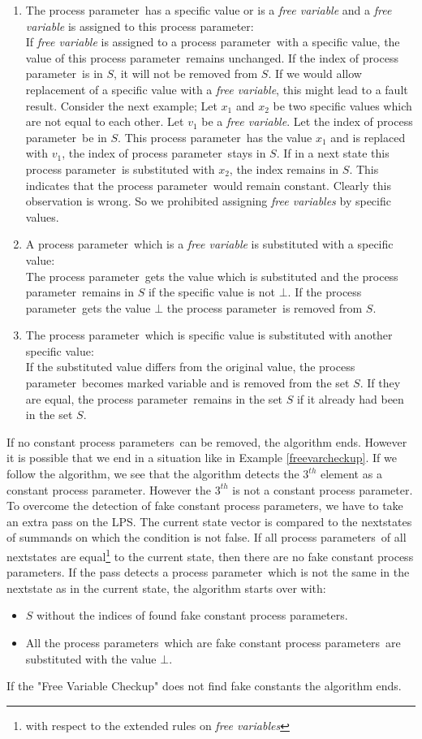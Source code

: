 \index{}\documentclass[a4paper,10pt]{article}
\theoremstyle{plain}
\theoremstyle{definition}
\newcommand{\pp}{process parameter}
\newcommand{\pps}{process parameters}
\newcommand{\ti}{\textit}
\begin{document}
\begin{enumerate}
\item The \pp\ has a specific value or is a \ti{free variable} and a \ti{free variable} is assigned to this \pp :\\
If \ti{free variable} is assigned to a \pp\ with a specific value, the value of this \pp\ remains unchanged. If the index of \pp\ is in $S$, it will not be removed from $S$. If we would allow replacement of a specific value with a \ti{free variable}, this might lead to a fault result. Consider the next example; Let $x_1$ and $x_2$ be two specific values which are not equal to each other. Let $v_1$ be a \ti{free variable}. Let the index of \pp\ be in $S$. This \pp\ has the value $x_1$ and is replaced with $v_1$, the index of \pp\ stays in $S$. If in a next state this \pp\ is substituted with $x_2$, the index remains in $S$. This indicates that the \pp\ would remain constant. Clearly this observation is wrong. So we prohibited assigning \ti{free variables} by specific values.

\item A \pp\ which is a \ti{free variable} is substituted with a specific value:\\
The \pp\ gets the value which is substituted and the \pp\ remains in $S$ if the specific value is not $\bot$. If the \pp\ gets the value $\bot$ the \pp\ is removed from $S$.

\item The \pp\ which is specific value is substituted with another specific value:\\
If the substituted value differs from the original value, the \pp\ becomes marked variable and is removed from the set $S$.
If they are equal, the \pp\ remains in the set $S$ if it already had been in the set $S$.
\end{enumerate}

If no constant \pps\ can be removed, the algorithm ends. However it is possible that we end in a situation like in Example \ref{freevarcheckup}. If we follow the algorithm, we see that the algorithm detects the $3^{th}$ element as a constant \pp. However the $3^{th}$ is not a constant \pp . To overcome the detection of fake constant \pps , we have to take an extra pass on the LPS. The current state vector is compared to the nextstates of summands on which the condition is not false.
If all \pps\ of all nextstates are equal\footnote{with respect to the extended rules on \ti{free variables}} to the current state, then there are no fake constant \pps . If the pass detects a \pp\ which is not the same in the nextstate as in the current state, the algorithm starts over with:
\begin{itemize}
\item $S$ without the indices of found fake constant \pps .
\item All the \pps\ which are fake constant \pps\ are substituted with the value $\bot$.
\end{itemize}
If the "Free Variable Checkup" does not find fake constants the algorithm ends.
\end{document}
